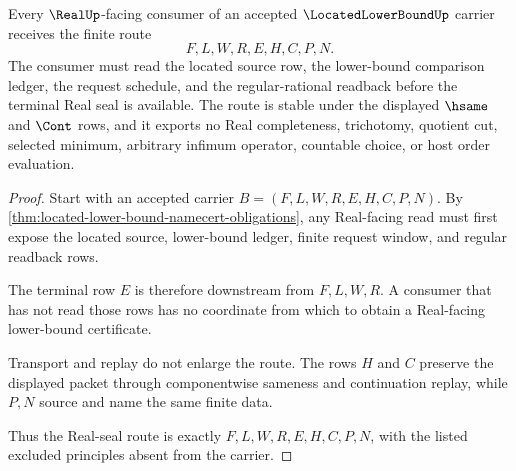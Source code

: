 \begin{theorem}
\label{thm:located-lower-bound-real-seal-route}
Every $\RealUp$-facing consumer of an accepted $\LocatedLowerBoundUp$ carrier receives the finite route
$$
F,L,W,R,E,H,C,P,N .
$$
The consumer must read the located source row, the lower-bound comparison ledger, the request schedule, and the regular-rational readback before the terminal Real seal is available. The route is stable under the displayed $\hsame$ and $\Cont$ rows, and it exports no Real completeness, trichotomy, quotient cut, selected minimum, arbitrary infimum operator, countable choice, or host order evaluation.
\end{theorem}
\begin{proof}
Start with an accepted carrier $B=(F,L,W,R,E,H,C,P,N)$. By \autoref{thm:located-lower-bound-namecert-obligations}, any Real-facing read must first expose the located source, lower-bound ledger, finite request window, and regular readback rows.

The terminal row $E$ is therefore downstream from $F,L,W,R$. A consumer that has not read those rows has no coordinate from which to obtain a Real-facing lower-bound certificate.

Transport and replay do not enlarge the route. The rows $H$ and $C$ preserve the displayed packet through componentwise sameness and continuation replay, while $P,N$ source and name the same finite data.

Thus the Real-seal route is exactly $F,L,W,R,E,H,C,P,N$, with the listed excluded principles absent from the carrier.
\end{proof}

\begin{closurestatus}{\LocatedLowerBoundUp}
  \theoryclosure{\seedClosure}
  \formalstatus{\encodedDefV}
\end{closurestatus}
